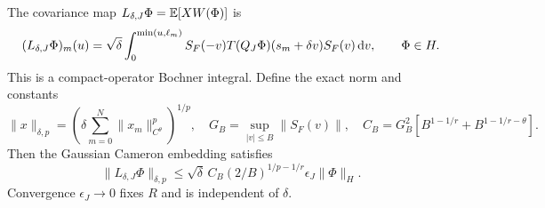 \begin{proposition}
  \label{P:cameron-actual-embedding}
  The covariance map $L_{\delta,J}\Phi = \mathbb{E}[XW(\Phi)]$ is
  \begin{equation}\label{E:cameron-actual-covariance}
    (L_{\delta,J}\Phi)_m(u)=\sqrt\delta
    \int_0^{\min(u,\ell_m)}
    S_F(-v)T(Q_J\Phi)(s_m+\delta v)S_F(v)\,\mathrm{d} v ,
    \qquad \Phi\in H.
  \end{equation}
  This is a compact-operator Bochner integral. Define the exact norm and
  constants
  \begin{equation}\label{E:cameron-averaged-norm}
    \|x\|_{\delta,p}
    =\left(\delta\sum_{m=0}^N\|x_m\|_{C^\theta}^p\right)^{1/p},
    \quad G_B=\sup_{|v|\le B}\|S_F(v)\|,
    \quad C_B=G_B^2[B^{1-1/r}+B^{1-1/r-\theta}].
  \end{equation}
  Then the Gaussian Cameron embedding satisfies
  \begin{equation}\label{E:cameron-averaged-bound}
    \|L_{\delta,J}\Phi\|_{\delta,p}
    \le\sqrt\delta\,C_B(2/B)^{1/p-1/r}
    \epsilon_J\|\Phi\|_H .
  \end{equation}
  Convergence $\epsilon_J \to 0$ fixes $R$ and is independent of $\delta$.
\end{proposition}

